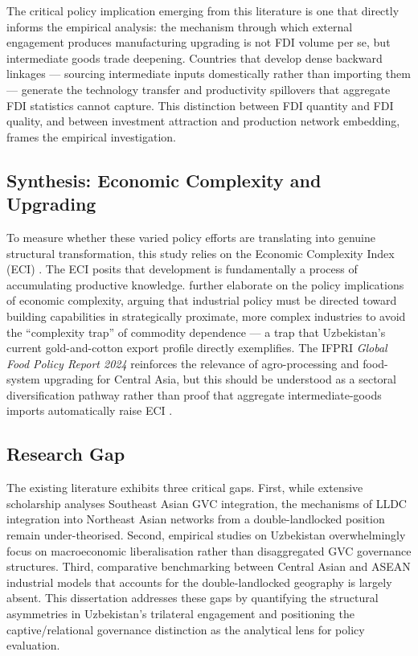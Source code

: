 The critical policy implication emerging from this literature is one that directly informs the empirical analysis: the mechanism through which external engagement produces manufacturing upgrading is not FDI volume per se, but intermediate goods trade deepening. Countries that develop dense backward linkages --- sourcing intermediate inputs domestically rather than importing them --- generate the technology transfer and productivity spillovers that aggregate FDI statistics cannot capture. This distinction between FDI quantity and FDI quality, and between investment attraction and production network embedding, frames the empirical investigation.

\subsection{Synthesis: Economic Complexity and Upgrading}

To measure whether these varied policy efforts are translating into genuine structural transformation, this study relies on the Economic Complexity Index (ECI) \citep{hidalgo2009}. The ECI posits that development is fundamentally a process of accumulating productive knowledge. \citet{andreoni2023cje} further elaborate on the policy implications of economic complexity, arguing that industrial policy must be directed toward building capabilities in strategically proximate, more complex industries to avoid the ``complexity trap'' of commodity dependence --- a trap that Uzbekistan's current gold-and-cotton export profile directly exemplifies. The IFPRI \textit{Global Food Policy Report 2024} reinforces the relevance of agro-processing and food-system upgrading for Central Asia, but this should be understood as a sectoral diversification pathway rather than proof that aggregate intermediate-goods imports automatically raise ECI \citep{ifpri2024gfr}.

\subsection{Research Gap}

The existing literature exhibits three critical gaps. First, while extensive scholarship analyses Southeast Asian GVC integration, the mechanisms of LLDC integration into Northeast Asian networks from a double-landlocked position remain under-theorised. Second, empirical studies on Uzbekistan overwhelmingly focus on macroeconomic liberalisation rather than disaggregated GVC governance structures. Third, comparative benchmarking between Central Asian and ASEAN industrial models that accounts for the double-landlocked geography is largely absent. This dissertation addresses these gaps by quantifying the structural asymmetries in Uzbekistan's trilateral engagement and positioning the captive/relational governance distinction as the analytical lens for policy evaluation.
